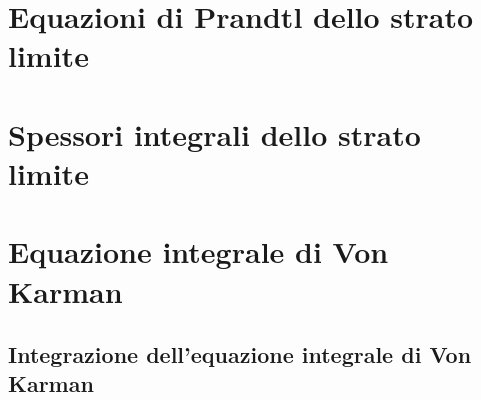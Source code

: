 \section{Equazioni di Prandtl dello strato limite}

\section{Spessori integrali dello strato limite}

\section{Equazione integrale di Von Karman}

\subsection{Integrazione dell'equazione integrale di Von Karman}
